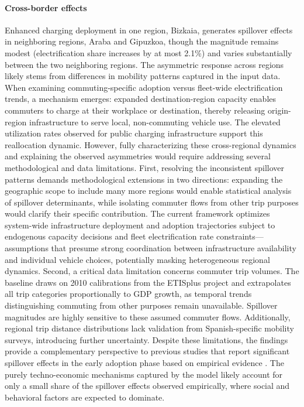 \paragraph*{Cross-border effects}
Enhanced charging deployment in one region, Bizkaia, generates spillover effects in neighboring regions, Araba and Gipuzkoa, though the magnitude remains modest (electrification share increases by at most 2.1\%) and varies substantially between the two neighboring regions.
The asymmetric response across regions likely stems from differences in mobility patterns captured in the input data. When examining commuting-specific adoption versus fleet-wide electrification trends, a mechanism emerges: expanded destination-region capacity enables commuters to charge at their workplace or destination, thereby releasing origin-region infrastructure to serve local, non-commuting vehicle use. The elevated utilization rates observed for public charging infrastructure support this reallocation dynamic.
However, fully characterizing these cross-regional dynamics and explaining the observed asymmetries would require addressing several methodological and data limitations.
First, resolving the inconsistent spillover patterns demands methodological extensions in two directions: expanding the geographic scope to include many more regions would enable statistical analysis of spillover determinants, while isolating commuter flows from other trip purposes would clarify their specific contribution. The current framework optimizes system-wide infrastructure deployment and adoption trajectories subject to endogenous capacity decisions and fleet electrification rate constraints—assumptions that presume strong coordination between infrastructure availability and individual vehicle choices, potentially masking heterogeneous regional dynamics.
Second, a critical data limitation concerns commuter trip volumes. The baseline draws on 2010 calibrations from the ETISplus project \cite{ETISplus_233596} and extrapolates all trip categories proportionally to GDP growth, as temporal trends distinguishing commuting from other purposes remain unavailable. Spillover magnitudes are highly sensitive to these assumed commuter flows. Additionally, regional trip distance distributions lack validation from Spanish-specific mobility surveys, introducing further uncertainty.
Despite these limitations, the findings provide a complementary perspective to previous studies that report significant spillover effects in the early adoption phase based on empirical evidence \cite{QIAN2024104400, SELENASHENG2022103256}. The purely techno-economic mechanisms captured by the model likely account for only a small share of the spillover effects observed empirically, where social and behavioral factors are expected to dominate.

